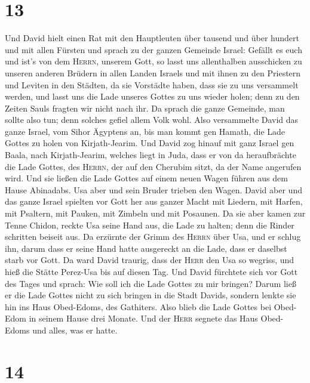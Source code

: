 \hypertarget{section-12}{%
\section{13}\label{section-12}}

 Und David hielt einen Rat mit den Hauptleuten über
tausend und über hundert und mit allen Fürsten  und sprach
zu der ganzen Gemeinde Israel: Gefällt es euch und ist's von dem
\textsc{Herrn}, unserem Gott, so lasst uns allenthalben ausschicken zu
unseren anderen Brüdern in allen Landen Israels und mit ihnen zu den
Priestern und Leviten in den Städten, da sie Vorstädte haben, dass sie
zu uns versammelt werden,  und lasst uns die Lade unseres
Gottes zu uns wieder holen; denn zu den Zeiten Sauls fragten wir nicht
nach ihr.  Da sprach die ganze Gemeinde, man sollte also
tun; denn solches gefiel allem Volk wohl.  Also
versammelte David das ganze Israel, vom Sihor Ägyptens an, bis man kommt
gen Hamath, die Lade Gottes zu holen von Kirjath-Jearim. 
Und David zog hinauf mit ganz Israel gen Baala, nach Kirjath-Jearim,
welches liegt in Juda, dass er von da heraufbrächte die Lade Gottes, des
\textsc{Herrn}, der auf den Cherubim sitzt, da der Name angerufen wird.
 Und sie ließen die Lade Gottes auf einem neuen Wagen
führen aus dem Hause Abinadabs. Usa aber und sein Bruder trieben den
Wagen.  David aber und das ganze Israel spielten vor Gott
her aus ganzer Macht mit Liedern, mit Harfen, mit Psaltern, mit Pauken,
mit Zimbeln und mit Posaunen.  Da sie aber kamen zur Tenne
Chidon, reckte Usa seine Hand aus, die Lade zu halten; denn die Rinder
schritten beiseit aus.  Da erzürnte der Grimm des
\textsc{Herrn} über Usa, und er schlug ihn, darum dass er seine Hand
hatte ausgereckt an die Lade, dass er daselbst starb vor Gott.
 Da ward David traurig, dass der \textsc{Herr} den Usa so
wegriss, und hieß die Stätte Perez-Usa bis auf diesen Tag.
 Und David fürchtete sich vor Gott des Tages und sprach:
Wie soll ich die Lade Gottes zu mir bringen?  Darum ließ
er die Lade Gottes nicht zu sich bringen in die Stadt Davids, sondern
lenkte sie hin ins Haus Obed-Edoms, des Gathiters.  Also
blieb die Lade Gottes bei Obed-Edom in seinem Hause drei Monate. Und der
\textsc{Herr} segnete das Haus Obed-Edoms und alles, was er hatte.

\hypertarget{section-13}{%
\section{14}\label{section-13}}

